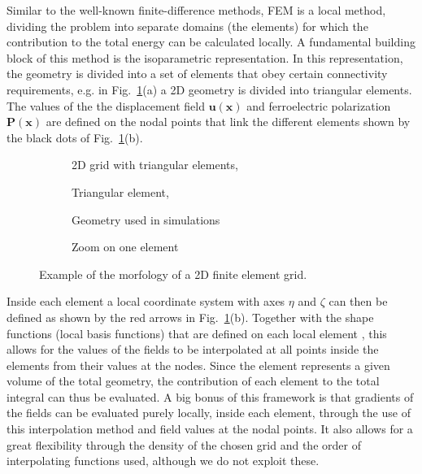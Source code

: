 Similar to the well-known finite-difference methods, FEM is a local method, dividing the problem into separate domains (the elements) for which the contribution to the total energy can be calculated locally.
A fundamental building block of this method is the isoparametric representation.
In this representation, the geometry is divided into a set of elements that obey certain connectivity requirements, e.g. in Fig.~\ref{fig:BTO_fem}(a) a 2D geometry is divided into triangular elements.
The values of the the displacement field $\mathbf{u}(\mathbf{x})$ and ferroelectric polarization $\mathbf{P}(\mathbf{x})$ are defined on the nodal points that link the different elements shown by the black dots of Fig.~\ref{fig:BTO_fem}(b).    
\begin{figure}
	\begin{subfigure}{0.49\textwidth}
		\caption{2D grid with triangular elements, \cite{Biner}}
	\end{subfigure}
	\begin{subfigure}{0.49\textwidth}
		\caption{Triangular element, }
	\end{subfigure}
	\begin{subfigure}{0.49\textwidth}
		\caption{Geometry used in simulations}
	\end{subfigure}
	\begin{subfigure}{0.49\textwidth}
		\caption{Zoom on one element}
	\end{subfigure}
	\caption{\label{fig:BTO_fem} Example of the morfology of a 2D finite element grid.}
\end{figure}
Inside each element a local coordinate system with axes $\eta$ and $\zeta$ can then be defined as shown by the red arrows in Fig.~\ref{fig:BTO_fem}(b).
Together with the shape functions (local basis functions) that are defined on each local element , this allows for the values of the fields to be interpolated at all points inside the elements from their values at the nodes.
Since the element represents a given volume of the total geometry, the contribution of each element to the total integral can thus be evaluated.
A big bonus of this framework is that gradients of the fields can be evaluated purely locally, inside each element, through the use of this interpolation method and field values at the nodal points.
It also allows for a great flexibility through the density of the chosen grid and the order of interpolating functions used, although we do not exploit these.

